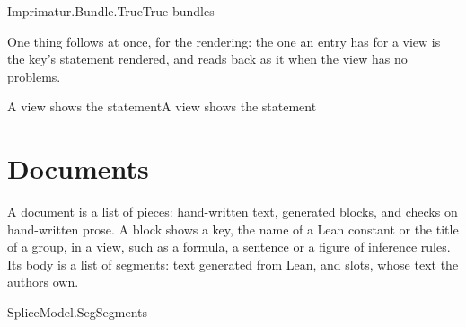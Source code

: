 \documentclass[acmsmall,screen,review,anonymous,nonacm]{acmart}
\begin{document}
\begin{leandef}[sum=BO-FFbUkKC, dflt=ajF32tA2Kd]{Imprimatur.Bundle.True}{True bundles}
\begin{LeanDisplay}
\end{LeanDisplay}
\end{leandef}

One thing follows at once, for the rendering: the one an entry has for a
view is the key's statement rendered, and reads back as it when the view
has no problems.

\begin{leantheorem}[sum=Xa6Hcbi0zI]{A view shows the statement}{A view shows the statement}
\label{thm:A-view-shows-the-statement}
\end{leantheorem}

\section{Documents}\label{sec:documents}

A document is a list of pieces: hand-written text, generated blocks, and
checks on hand-written prose. A block shows a key, the name of a Lean
constant or the title of a group, in a view, such as a formula, a sentence
or a figure of inference rules. Its body is a list of segments: text
generated from Lean, and slots, whose text the authors own.

\begin{leangrammar}[sum=LI8COyXMC-, dflt=T0UuA_Mbm_]{SpliceModel.Seg}{Segments}
\label{gram:SpliceModel.Seg}\begin{LeanDisplay}
\\
\\
\end{LeanDisplay}
\end{leangrammar}
\end{document}
